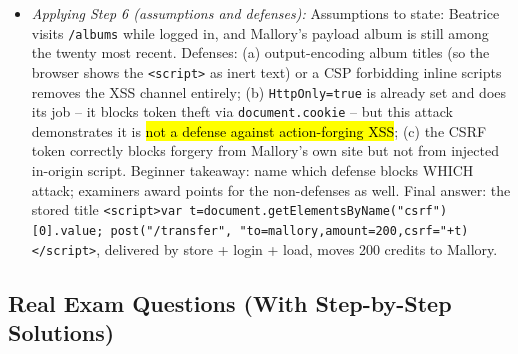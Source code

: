\documentclass[12pt, a4paper]{article}
\newcommand{\imp}[1]{\hl{#1}}                       %
\begin{document}
\begin{itemize}
    \imp{A CSRF token defeats CSRF but not in-origin script}.
    \item \textit{Applying Step 6 (assumptions and defenses):} Assumptions to state: Beatrice visits \texttt{/albums} while logged in, and Mallory's payload album is still among the twenty most recent.
    Defenses: (a) output-encoding album titles (so the browser shows the \texttt{<script>} as inert text) or a CSP forbidding inline scripts removes the XSS channel entirely; (b) \texttt{HttpOnly=true} is already set and does its job -- it blocks token theft via \texttt{document.cookie} -- but this attack demonstrates it is \imp{not a defense against action-forging XSS};
    (c) the CSRF token correctly blocks forgery from Mallory's own site but not from injected in-origin script. Beginner takeaway: name which defense blocks WHICH attack; examiners award points for the non-defenses as well.
    Final answer: the stored title \texttt{<script>var t=document.getElementsByName("csrf")[0].value; post("/transfer", "to=mallory,amount=200,csrf="+t)</script>}, delivered by store + login + load, moves 200 credits to Mallory.
\end{itemize}

\subsection*{Real Exam Questions (With Step-by-Step Solutions)}
\end{document}
